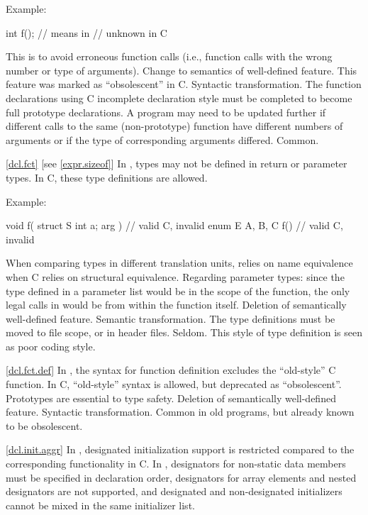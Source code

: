 Example:

\begin{codeblock}
int f();            // means    in \Cpp
                    //  unknown \tcode{)} in C
\end{codeblock}

\rationale
This is to avoid erroneous function calls (i.e., function calls
with the wrong number or type of arguments).
\effect
Change to semantics of well-defined feature.
This feature was marked as ``obsolescent'' in C.
\difficulty
Syntactic transformation.
The function declarations using C incomplete declaration style must
be completed to become full prototype declarations.
A program may need to be updated further if different calls to the
same (non-prototype) function have different numbers of arguments or
if the type of corresponding arguments differed.
\howwide
Common.

\ref{dcl.fct} [see \ref{expr.sizeof}]
\change In \Cpp, types may not be defined in return or parameter types.
In C, these type definitions are allowed.

Example:

\begin{codeblock}
void f( struct S { int a; } arg ) {}    // valid C, invalid \Cpp
enum E { A, B, C } f() {}               // valid C, invalid \Cpp
\end{codeblock}

\rationale
When comparing types in different translation units, \Cpp relies
on name equivalence when C relies on structural equivalence.
Regarding parameter types: since the type defined in a parameter list
would be in the scope of the function, the only legal calls in \Cpp
would be from within the function itself.
\effect
Deletion of semantically well-defined feature.
\difficulty
Semantic transformation.
The type definitions must be moved to file scope, or in header files.
\howwide
Seldom.
This style of type definition is seen as poor coding style.

\ref{dcl.fct.def}
\change In \Cpp, the syntax for function definition excludes the ``old-style'' C function.
In C, ``old-style'' syntax is allowed, but deprecated as ``obsolescent''.
\rationale
Prototypes are essential to type safety.
\effect
Deletion of semantically well-defined feature.
\difficulty
Syntactic transformation.
\howwide
Common in old programs, but already known to be obsolescent.

\ref{dcl.init.aggr}
\change
In \Cpp, designated initialization support is restricted
compared to the corresponding functionality in C.
In \Cpp,
designators for non-static data members
must be specified in declaration order,
designators for array elements and nested designators
are not supported,
and
designated and non-designated initializers
cannot be mixed in the same initializer list.

